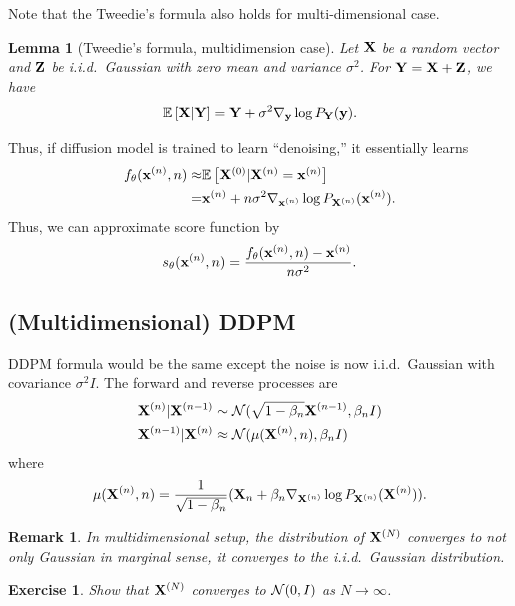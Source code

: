 \documentclass[11pt, a4paper]{article}
\newtheorem{exercise}{Exercise}
\newtheorem{remark}{Remark}
\newtheorem{lemma}{Lemma}
\begin{document}
Note that the Tweedie's formula also holds for multi-dimensional case.
\begin{lemma}[Tweedie's formula, multidimension case]
Let ${\bf X}$ be a random vector and ${\bf Z}$ be i.i.d.~Gaussian with zero mean and variance $\sigma^2$.
For ${\bf Y} = {\bf X} + {\bf Z}$, we have
\begin{align}
    \Expec{\bX|\bY} = \bY + \sigma^2 \nabla_{\by} \log P_{\bY} (\by).
\end{align}
\end{lemma}

Thus, if diffusion model is trained to learn ``denoising,'' it essentially learns
\begin{align}
    f_{\theta}(\bx^{(n)}, n) \approx& \Expec{\bX^{(0)}| \bX^{(n)}=\bx^{(n)}}\\
    =& \bx^{(n)} + n\sigma^2 \nabla_{\bx^{(n)}} \log P_{\bX^{(n)}}(\bx^{(n)}).
\end{align}
Thus, we can approximate score function by
\begin{align}
    s_{\theta}({\bf x}^{(n)}, n) = \frac{f_{\theta}({\bf x}^{(n)}, n) - {\bf x}^{(n)}}{n\sigma^2}.
\end{align}



\subsection{(Multidimensional) DDPM~\cite{ho2020denoising}}
DDPM formula would be the same except the noise is now i.i.d.~Gaussian with covariance $\sigma^2 I$.
The forward and reverse processes are
\begin{align}
    {\bf X}^{(n)}|{\bf X}^{(n-1)} &\sim {\cal N}(\sqrt{1-\beta_n}{\bf X}^{(n-1)}, \beta_nI)\\
    {\bf X}^{(n-1)}|{\bf X}^{(n)} &\approx {\cal N}(\mu({\bf X}^{(n)}, n), \beta_nI)
\end{align}
where 
\begin{align}
    \mu({\bf X}^{(n)}, n) = \frac{1}{\sqrt{1-\beta_n}} ({\bf X}_n + \beta_n \nabla_{{\bf X}^{(n)}}\log P_{{\bf X}^{(n)}} ({\bf X}^{(n)})).
\end{align}

\begin{remark}
    In multidimensional setup, the distribution of ${\bf X}^{(N)}$ converges to not only Gaussian in marginal sense,
    it converges to the i.i.d.~Gaussian distribution.
\end{remark}
\begin{exercise}
    Show that ${\bf X}^{(N)}$ converges to ${\cal N}(0, I)$ as $N\rightarrow\infty$.
\end{exercise}
\end{document}
